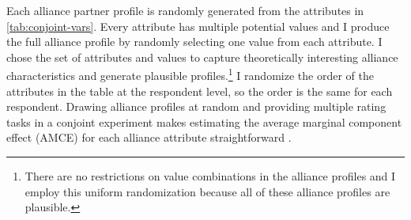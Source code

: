 \documentclass[12pt]{article}
\begin{document}
Each alliance partner profile is randomly generated from the attributes in \autoref{tab:conjoint-vars}.
Every attribute has multiple potential values and I produce the full alliance profile by randomly selecting one value from each attribute. 
I chose the set of attributes and values to capture theoretically interesting alliance characteristics and generate plausible profiles.\footnote{There are no restrictions on value combinations in the alliance profiles and I employ this uniform randomization because all of these alliance profiles are plausible.} %
I randomize the order of the attributes in the table at the respondent level, so the order is the same for each respondent. 
Drawing alliance profiles at random and providing multiple rating tasks in a conjoint experiment makes estimating the average marginal component effect (AMCE) for each alliance attribute straightforward \citep{Hainmuelleretal2014}. 
\end{document}
